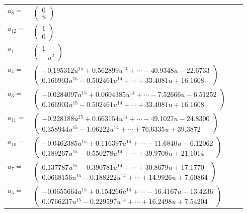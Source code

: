\documentclass[1p]{elsarticle_modified}
\theoremstyle{definition}
\begin{document}
\begin{tabular}{m{7pt} m{180pt} m{7pt} m{180pt} }
\flushright $a_{8}=$&$\begin{pmatrix}0\\u\end{pmatrix}$ \\
\flushright $a_{12}=$&$\begin{pmatrix}1\\0\end{pmatrix}$ \\
\flushright $a_{1}=$&$\begin{pmatrix}1\\- u^2\end{pmatrix}$ \\
\flushright $a_{4}=$&$\begin{pmatrix}-0.195312 u^{15}+0.562899 u^{14}+\cdots-40.9348 u-22.6733\\0.166903 u^{15}-0.502461 u^{14}+\cdots+33.4081 u+16.1608\end{pmatrix}$ \\
\flushright $a_{3}=$&$\begin{pmatrix}-0.0284097 u^{15}+0.0604385 u^{14}+\cdots-7.52666 u-6.51252\\0.166903 u^{15}-0.502461 u^{14}+\cdots+33.4081 u+16.1608\end{pmatrix}$ \\
\flushright $a_{11}=$&$\begin{pmatrix}-0.228188 u^{15}+0.663154 u^{14}+\cdots-49.1027 u-24.8300\\0.358944 u^{15}-1.06222 u^{14}+\cdots+76.6335 u+39.3872\end{pmatrix}$ \\
\flushright $a_{10}=$&$\begin{pmatrix}-0.0462385 u^{15}+0.116397 u^{14}+\cdots-11.6840 u-6.12062\\0.189267 u^{15}-0.550278 u^{14}+\cdots+39.9708 u+21.1014\end{pmatrix}$ \\
\flushright $a_{7}=$&$\begin{pmatrix}0.137787 u^{15}-0.390781 u^{14}+\cdots+30.8679 u+17.1770\\0.0668156 u^{15}-0.188222 u^{14}+\cdots+14.9926 u+7.60864\end{pmatrix}$ \\
\flushright $a_{5}=$&$\begin{pmatrix}-0.0655664 u^{15}+0.154266 u^{14}+\cdots-16.4167 u-13.4236\\0.0766237 u^{15}-0.229597 u^{14}+\cdots+16.2498 u+7.54204\end{pmatrix}$ \\

\end{tabular}
\end{document}
